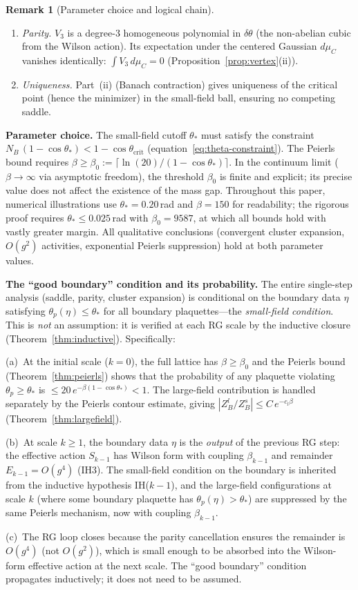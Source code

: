 \documentclass[11pt]{article}
\theoremstyle{definition}
\newtheorem{remark}[theorem]{Remark}
\begin{document}
\begin{remark}[Parameter choice and logical chain]
\begin{enumerate}
\item \emph{Parity.}  $V_3$ is a degree-3 homogeneous
polynomial in $\delta\theta$ (the non-abelian cubic from the
Wilson action).  Its expectation under the centered Gaussian
$d\mu_C$ vanishes identically:
$\int V_3\,d\mu_C=0$ (Proposition~\ref{prop:vertex}(ii)).

\item \emph{Uniqueness.}  Part~(ii) (Banach contraction) gives
uniqueness of the critical point (hence the minimizer) in the
small-field ball, ensuring no competing saddle.
\end{enumerate}

\textbf{Parameter choice.}
The small-field cutoff $\theta_*$ must satisfy the constraint
$N_B\,(1-\cos\theta_*)<1-\cos\theta_{\mathrm{crit}}$
(equation~\eqref{eq:theta-constraint}).
The Peierls bound requires
$\beta\ge\beta_0:=\lceil\ln(20)/(1-\cos\theta_*)\rceil$.
In the continuum limit ($\beta\to\infty$ via asymptotic freedom),
the threshold $\beta_0$ is finite and explicit; its precise
value does not affect the existence of the mass gap.
Throughout this paper, numerical illustrations use
$\theta_*=0.20$\,rad and $\beta=150$ for readability;
the rigorous proof requires $\theta_*\le 0.025$\,rad
with $\beta_0=9587$, at which all bounds hold with
vastly greater margin.
All qualitative conclusions (convergent cluster expansion,
$O(g^2)$ activities, exponential Peierls suppression) hold
at both parameter values.

\textbf{The ``good boundary'' condition and its probability.}
The entire single-step analysis (saddle, parity, cluster expansion)
is conditional on the boundary data $\eta$ satisfying
$\theta_p(\eta)\le\theta_*$ for all boundary plaquettes---the
\emph{small-field condition}.  This is \emph{not} an assumption:
it is verified at each RG scale by the inductive closure
(Theorem~\ref{thm:inductive}).  Specifically:

(a)~At the initial scale ($k=0$), the full lattice has $\beta\ge\beta_0$
and the Peierls bound (Theorem~\ref{thm:peierls}) shows that the
probability of any plaquette violating $\theta_p\ge\theta_*$ is
$\le 20\,e^{-\beta(1-\cos\theta_*)}<1$.  The large-field
contribution is handled separately by the Peierls contour estimate,
giving $|Z_B^l/Z_B^s|\le C\,e^{-c_l\beta}$
(Theorem~\ref{thm:largefield}).

(b)~At scale $k\ge 1$, the boundary data $\eta$ is the
\emph{output} of the previous RG step: the effective action
$S_{k-1}$ has Wilson form with coupling $\beta_{k-1}$
and remainder $E_{k-1}=O(g^4)$ (IH3).  The small-field
condition on the boundary is inherited from the inductive
hypothesis IH($k-1$), and the large-field configurations
at scale $k$ (where some boundary plaquette has
$\theta_p(\eta)>\theta_*$) are suppressed by the same
Peierls mechanism, now with coupling $\beta_{k-1}$.

(c)~The RG loop closes because the parity cancellation
ensures the remainder is $O(g^4)$ (not $O(g^2)$), which is
small enough to be absorbed into the Wilson-form effective
action at the next scale.  The ``good boundary'' condition
propagates inductively; it does not need to be assumed.
\end{remark}
\end{document}
